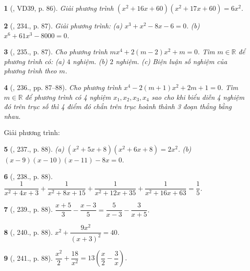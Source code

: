 \documentclass{article}
\newtheorem{baitoan}{}
\begin{document}
\begin{baitoan}[\cite{Tuyen_Toan_9_old}, VD39, p. 86]
	Giải phương trình $(x^2 + 16x + 60)(x^2 + 17x + 60) = 6x^2$.
\end{baitoan}

\begin{baitoan}[\cite{Tuyen_Toan_9_old}, 234., p. 87]
	Giải phương trình: (a) $x^3 + x^2 - 8x - 6 = 0$. (b) $x^6 + 61x^3 - 8000 = 0$.
\end{baitoan}

\begin{baitoan}[\cite{Tuyen_Toan_9_old}, 235., p. 87]
	Cho phương trình $mx^4 + 2(m - 2)x^2 + m = 0$.  Tìm $m\in\mathbb{R}$ để phương trình có: (a) $4$ nghiệm. (b) $2$ nghiệm. (c) Biện luận số nghiệm của phương trình theo $m$.
\end{baitoan}

\begin{baitoan}[\cite{Tuyen_Toan_9_old}, 236., pp. 87--88]
	Cho phương trình $x^4 - 2(m + 1)x^2 + 2m + 1 = 0$. Tìm $m\in\mathbb{R}$ để phương trình có 4 nghiệm $x_1,x_2,x_3,x_4$ sao cho khi biểu diễn 4 nghiệm đó trên trục số thì 4 điểm đó chắn trên trục hoành thành 3 đoạn thẳng bằng nhau.
\end{baitoan}
Giải phương trình:

\begin{baitoan}[\cite{Tuyen_Toan_9_old}, 237., p. 88]
	(a) $(x^2 + 5x + 8)(x^2 + 6x + 8) = 2x^2$. (b) $(x - 9)(x - 10)(x - 11) - 8x = 0$.
\end{baitoan}

\begin{baitoan}[\cite{Tuyen_Toan_9_old}, 238., p. 88]
	$\dfrac{1}{x^2 + 4x + 3} + \dfrac{1}{x^2 + 8x + 15} + \dfrac{1}{x^2 + 12x + 35} + \dfrac{1}{x^2 + 16x + 63}  = \dfrac{1}{5}$.
\end{baitoan}

\begin{baitoan}[\cite{Tuyen_Toan_9_old}, 239., p. 88]
	$\dfrac{x + 5}{3} - \dfrac{x - 3}{5} = \dfrac{5}{x - 3} - \dfrac{3}{x + 5}$.
\end{baitoan}

\begin{baitoan}[\cite{Tuyen_Toan_9_old}, 240., p. 88]
	$x^2 + \dfrac{9x^2}{(x + 3)^2} = 40$.
\end{baitoan}

\begin{baitoan}[\cite{Tuyen_Toan_9_old}, 241., p. 88]
	$\dfrac{x^2}{2} + \dfrac{18}{x^2} = 13\left(\dfrac{x}{2} - \dfrac{3}{x}\right)$.
\end{baitoan}
\end{document}
